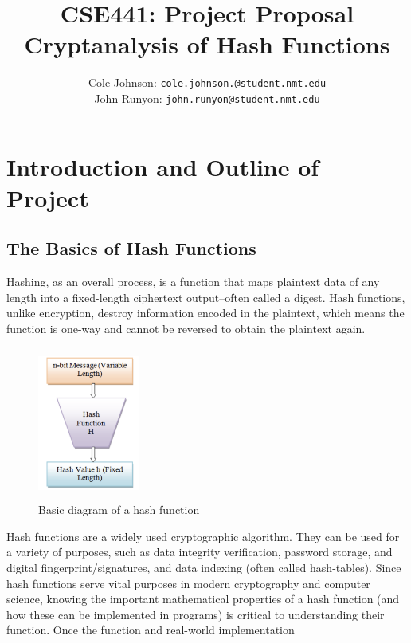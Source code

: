 \documentclass[12pt,english]{article}
\author{
    Cole Johnson: \texttt{cole.johnson.@student.nmt.edu}
    \\ 
    John Runyon: \texttt{john.runyon@student.nmt.edu}
}
\title{
    CSE441: Project Proposal\\
    \large{Cryptanalysis of Hash Functions}
}
\begin{document}
\maketitle
\section*{Introduction and Outline of Project}
\subsection{The Basics of Hash Functions}
Hashing, as an overall process, is a function that maps
plaintext data of any length into a fixed-length ciphertext
output--often called a digest. Hash functions, unlike encryption,
destroy information encoded in the plaintext, which means
the function is one-way and cannot be reversed to obtain
the plaintext again.

\begin{figure}
    \begin{center}
      \includegraphics[clip=true,height=5cm, width=0.3\textwidth]{images/hash_function.png}
    \end{center}
    \caption{Basic diagram of a hash function}
  \end{figure}

Hash functions are a widely used cryptographic algorithm.
They can be used for a variety of purposes, such as
data integrity verification, password storage, and digital
fingerprint/signatures, and data indexing (often called hash-tables).
Since hash functions serve vital purposes in modern cryptography
and computer science, knowing the important mathematical properties
of a hash function (and how these can be implemented in programs)
is critical to understanding their function. Once the function and
real-world implementation
\end{document}
